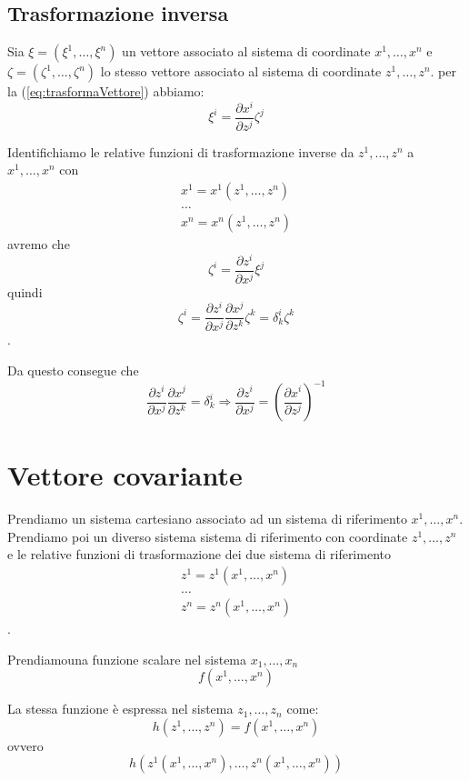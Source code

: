 \documentclass[a4paper,11pt]{article}
\begin{document}
\subsection{Trasformazione inversa}
Sia $\xi = (\xi ^1, \dots , \xi ^n)$ un vettore associato al sistema di coordinate $ x^1, \dots , x^n $ e 
$\zeta = (\zeta ^1, \dots , \zeta ^n)$ lo stesso vettore associato al sistema di coordinate $ z^1, \dots , z^n $.
per la (\ref{eq:trasformaVettore}) abbiamo:
\[
  \xi ^i = \frac{\partial x^i}{\partial z^j} \zeta ^j
\]

Identifichiamo le relative funzioni di trasformazione inverse da $ z^1, \dots , z^n $ a  $ x^1, \dots , x^n $  con
\begin{eqnarray*}
  x^1=x^1(z^1, \dots, z^n)
  \\
  \dots
  \\
  x^n=x^n(z^1, \dots, z^n)
\end{eqnarray*}
avremo che 
\[
  \zeta ^i = \frac{\partial z^i}{\partial x^j} \xi ^j
\]
quindi
\[
  \zeta ^i = \frac{\partial z^i}{\partial x^j} \frac{\partial x^j}{\partial z^k} \zeta ^k = \delta^i_k \zeta ^k
\].

Da questo consegue che
\begin{equation}
\frac{\partial z^i}{\partial x^j} \frac{\partial x^j}{\partial z^k} =  \delta^i_k
\Longrightarrow
\frac{\partial z^i}{\partial x^j} = \left( \frac{\partial x^i}{\partial z^j} \right)^{-1}
\end{equation}


\section{Vettore covariante}

Prendiamo un sistema cartesiano associato ad un sistema di riferimento $ x^1, \dots, x^n $.
Prendiamo poi un diverso sistema sistema di riferimento con coordinate $ z^1, \dots, z^n $ e le relative funzioni
di trasformazione dei due sistema di riferimento
\begin{eqnarray*}
  z^1=z^1(x^1, \dots, x^n)
  \\
  \dots
  \\
  z^n=z^n(x^1, \dots, x^n)
\end{eqnarray*}
.
 
Prendiamouna funzione scalare nel sistema $ x_1, \dots, x_n $ 
\[ f(x^1, \dots, x^n) \]

La stessa funzione è espressa nel sistema $ z_1, \dots, z_n $ come:
\[  h(z^1, \dots,  z^n) = f(x^1, \dots, x^n) \]
ovvero
\[
  h(z^1 ( x^1, \dots, x^n), \dots, z^n ( x^1, \dots, x^n) )
\]
\end{document}
